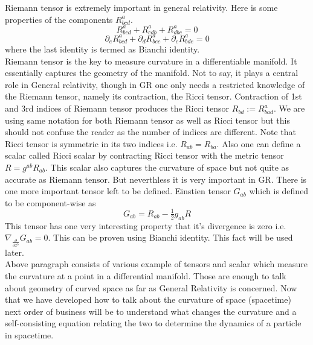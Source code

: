 \documentclass[a4paper]{report}
\theoremstyle{definition}
\theoremstyle{remark}
\begin{document}
		Riemann tensor is extremely important in general relativity. Here is some properties of the components $R^{a}_{bcd}$.
		\begin{equation*}
			R^{a}_{bcd}+R^{a}_{cdb}+R^{a}_{dbc} = 0
		\end{equation*}
		\begin{equation}\label{Bianchi}
			\partial_eR^{a}_{bcd}+\partial_dR^{a}_{bec}+\partial_cR^{a}_{bde} = 0
		\end{equation}
		where the last identity is termed as Bianchi identity.\\ Riemann tensor is the key to measure curvature in a differentiable manifold. It essentially captures the geometry of the manifold. Not to say, it plays a central role in General relativity, though in GR one only needs a restricted knowledge of the Riemann tensor, namely its contraction, the  Ricci tensor. Contraction of 1st and 3rd indices of Riemann tensor produces the Ricci tensor $R_{bd} := R_{bad}^{a}$. We are using same notation for both Riemann tensor as well as Ricci tensor but this should not confuse the reader as the number of indices are different. Note that Ricci tensor is symmetric in its two indices i.e. $R_{ab}=R_{ba}$. Also one can define a scalar called Ricci scalar by contracting Ricci tensor with the metric tensor $R=g^{ab}R_{ab}$. This scalar also captures the curvature of space but not quite as accurate as Riemann tensor. But neverthless it is very important in GR. There is one more important tensor left to be defined. Einstien tensor $G_{ab}$ which is defined to be component-wise as
		\begin{equation*}
			G_{ab} = R_{ab}-\tfrac{1}{2}g_{ab}R
		\end{equation*}  This tensor has one very interesting property that it's divergence is zero i.e. $\nabla_{\tfrac{\partial}{\partial x^b}}G_{ab} = 0$. This can be proven using Bianchi identity. This fact will be used later.\\
		Above paragraph consists of various example of tensors and scalar which measure the curvature at a point in a differential manifold. Those are enough to talk about geometry of curved space as far as General Relativity is concerned. Now that we have developed how to talk about the curvature of space (spacetime) next order of business will be to understand what changes the curvature and a self-consisting equation relating the two to determine the dynamics of a particle in spacetime.
\end{document}
